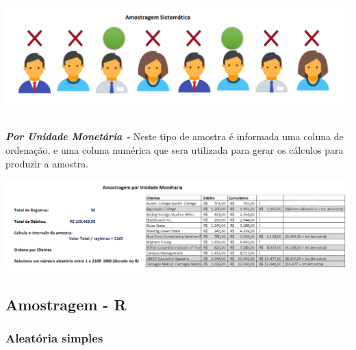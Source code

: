 {\centering \includegraphics[scale=0.45]{cap1/Amostragem/amostragemSistematica.png} \par}

\newpage

\textbf{\textit{\\Por Unidade Monetária -}}
Neste tipo de amostra é informada uma coluna de ordenação, e uma coluna numérica que sera utilizada 
para gerar os cálculos para produzir a amostra.

{\centering \includegraphics[scale=0.45]{cap1/Amostragem/amostragemPorUnidadeMonetaria.png} \par}

\newpage

\subsection{Amostragem - R} 

\subsubsection{Aleatória simples}

